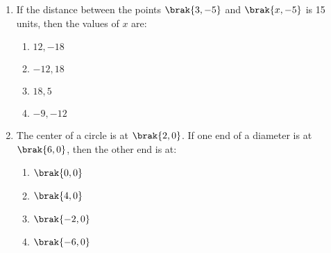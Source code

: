\begin{enumerate}
 \item If the distance between the points $\brak{3, -5}$ and $\brak{x, -5}$ is 15 units, then the values of $x$ are:
    \begin{enumerate}
    \item $12, -18$
    \item $-12, 18$
    \item $18, 5$
    \item $-9, -12$
    \end{enumerate}

    \item The center of a circle is at $\brak{2, 0}$. If one end of a diameter is at $\brak{6, 0}$, then the other end is at:
	\begin{enumerate}    
		\item $\brak{0, 0}$
		\item $\brak{4, 0}$
		\item $\brak{-2, 0}$
		\item $\brak{-6, 0}$
	\end{enumerate}

\end{enumerate}

